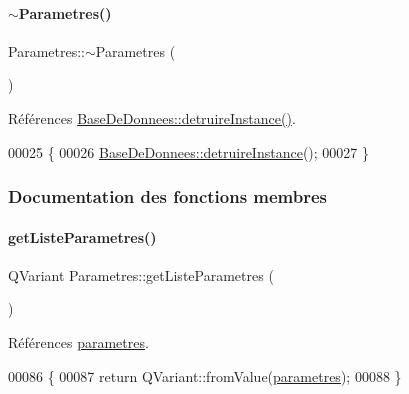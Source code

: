 \paragraph{\texorpdfstring{$\sim$\+Parametres()}{~Parametres()}}
{\footnotesize\ttfamily Parametres\+::$\sim$\+Parametres (\begin{DoxyParamCaption}{ }\end{DoxyParamCaption})}



Références \hyperlink{class_base_de_donnees_a457401c0816b888c77ce915997545f4e}{Base\+De\+Donnees\+::detruire\+Instance()}.


\begin{DoxyCode}
00025 \{
00026     \hyperlink{class_base_de_donnees_a457401c0816b888c77ce915997545f4e}{BaseDeDonnees::detruireInstance}();
00027 \}
\end{DoxyCode}


\subsubsection{Documentation des fonctions membres}
\mbox{\label{class_parametres_a1cd756fd21518bcec9349c08a2a3b08f}} 
\paragraph{\texorpdfstring{get\+Liste\+Parametres()}{getListeParametres()}}
{\footnotesize\ttfamily Q\+Variant Parametres\+::get\+Liste\+Parametres (\begin{DoxyParamCaption}{ }\end{DoxyParamCaption})}



Références \hyperlink{class_parametres_a3bff192351dd25f4109b258e954cecbf}{parametres}.


\begin{DoxyCode}
00086 \{
00087     \textcolor{keywordflow}{return} QVariant::fromValue(\hyperlink{class_parametres_a3bff192351dd25f4109b258e954cecbf}{parametres});
00088 \}
\end{DoxyCode}
\mbox{\label{class_parametres_a0102cadfb1bce5a8e82d6c12661fccf8}} 
